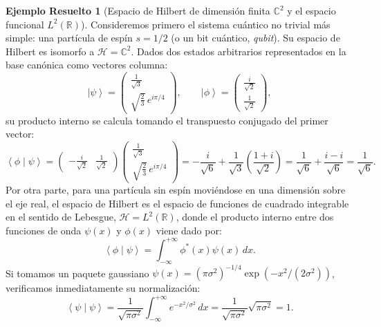 \documentclass[11pt,a4paper,twoside]{report}
\theoremstyle{definition}
\newtheorem{ejemplo}{Ejemplo Resuelto}[chapter]
\theoremstyle{plain}
\theoremstyle{remark}
\newcommand{\ket}[1]{\left| #1 \right\rangle}
\newcommand{\braket}[2]{\left\langle #1 \middle| #2 \right\rangle}
\newcommand{\Hil}{\mathcal{H}}
\begin{document}
\begin{ejemplo}[Espacio de Hilbert de dimensión finita $\mathbb{C}^2$ y el espacio funcional $L^2(\mathbb{R})$]
Consideremos primero el sistema cuántico no trivial más simple: una partícula de espín $s = 1/2$ (o un bit cuántico, \textit{qubit}). Su espacio de Hilbert es isomorfo a $\Hil = \mathbb{C}^2$. Dados dos estados arbitrarios representados en la base canónica como vectores columna:
\begin{equation}
    \ket{\psi} = \begin{pmatrix} \frac{1}{\sqrt{3}} \\ \sqrt{\frac{2}{3}}\, e^{i\pi/4} \end{pmatrix}, \qquad \ket{\phi} = \begin{pmatrix} \frac{i}{\sqrt{2}} \\ \frac{1}{\sqrt{2}} \end{pmatrix},
\end{equation}
su producto interno se calcula tomando el transpuesto conjugado del primer vector:
\begin{equation}
    \braket{\phi}{\psi} = \begin{pmatrix} -\frac{i}{\sqrt{2}} & \frac{1}{\sqrt{2}} \end{pmatrix} \begin{pmatrix} \frac{1}{\sqrt{3}} \\ \sqrt{\frac{2}{3}}\, e^{i\pi/4} \end{pmatrix} = -\frac{i}{\sqrt{6}} + \frac{1}{\sqrt{3}}\left(\frac{1+i}{\sqrt{2}}\right) = \frac{1}{\sqrt{6}} + \frac{i - i}{\sqrt{6}} = \frac{1}{\sqrt{6}}.
\end{equation}
Por otra parte, para una partícula sin espín moviéndose en una dimensión sobre el eje real, el espacio de Hilbert es el espacio de funciones de cuadrado integrable en el sentido de Lebesgue, $\Hil = L^2(\mathbb{R})$, donde el producto interno entre dos funciones de onda $\psi(x)$ y $\phi(x)$ viene dado por:
\begin{equation}
    \braket{\phi}{\psi} = \int_{-\infty}^{+\infty} \phi^*(x)\psi(x)\,dx.
\end{equation}
Si tomamos un paquete gaussiano $\psi(x) = (\pi \sigma^2)^{-1/4} \exp(-x^2/(2\sigma^2))$, verificamos inmediatamente su normalización:
\begin{equation}
    \braket{\psi}{\psi} = \frac{1}{\sqrt{\pi \sigma^2}} \int_{-\infty}^{+\infty} e^{-x^2/\sigma^2}\,dx = \frac{1}{\sqrt{\pi \sigma^2}} \sqrt{\pi \sigma^2} = 1.
\end{equation}
\end{ejemplo}
\end{document}

